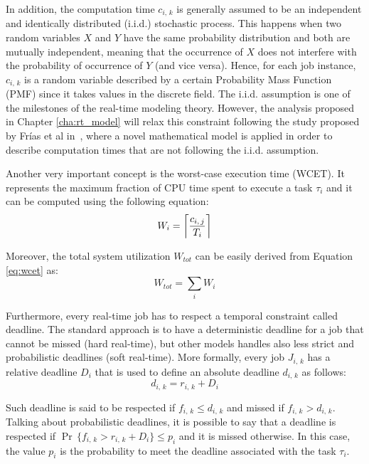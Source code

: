 In addition, the computation time \( c_{i,\,k} \) is generally assumed to be an
independent and identically distributed (i.i.d.) stochastic process.
This happens when two random variables \( X \) and \( Y \) have 
the same probability distribution and both are mutually
independent, meaning that the occurrence of \( X \) does not interfere with 
the probability of occurrence of \( Y \) (and vice versa).
Hence, for each job instance, \( c_{i,\,k} \) is a random
variable described by a certain Probability Mass Function (PMF) since it
takes values in the discrete field.
The i.i.d. assumption is one of the milestones of the real-time modeling theory.
However, the analysis proposed in Chapter \ref{cha:rt_model} will relax this 
constraint following the study proposed by Fr\'{i}as et al
in~\cite{frias2017probabilistic}, where a novel mathematical model is applied
in order to describe computation times that are not following the i.i.d.
assumption.

Another very important concept is the worst-case execution time (WCET).
It represents the maximum fraction of CPU time spent to execute a task
\( \tau_{i} \) and it can be computed using the following equation:
\begin{equation}\label{eq:wcet}
    W_{i} = \ceil[\bigg]{\frac{c_{i,\,j}}{T_{i}}}
\end{equation}

Moreover, the total system utilization \( W_{tot} \) can be easily derived from
Equation \ref{eq:wcet} as:
\begin{equation}\label{eq:system_utilization}
    W_{tot} = \displaystyle\sum_{i} W_{i}
\end{equation}

Furthermore, every real-time job has to respect a temporal constraint called
deadline. The standard approach is to have a deterministic deadline for a job
that cannot be missed (hard real-time), but other models handles also
less strict and probabilistic deadlines (soft real-time).
More formally, every job \( J_{i,\,k} \) has a relative deadline \( D_{i} \) that
is used to define an absolute deadline \( d_{i,\,k} \) as follows:
\begin{equation}
    d_{i,\,k} = r_{i,\,k} + D_{i}
\end{equation}

Such deadline is said to be respected if \( f_{i,\,k} \leq d_{i,\,k} \) and missed
if \( f_{i,\,k} > d_{i,\,k} \). Talking about probabilistic deadlines, it is
possible to say that a deadline is respected if 
\( \Pr\,\{f_{i,\,k} > r_{i,\,k} + D_{i} \} \leq p_{i} \) and it is missed otherwise.
In this case, the value \( p_{i} \) is the probability to meet the deadline associated
with the task \( \tau_{i} \).


